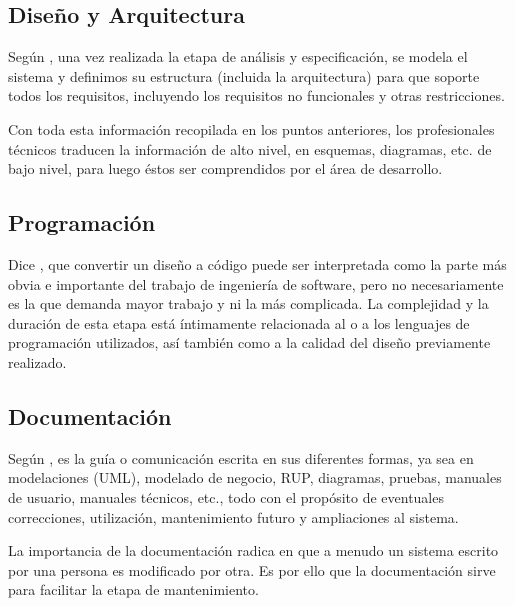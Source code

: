 \documentclass[12pt]{article}
\begin{document}
	\subsection{Diseño y Arquitectura}

	\hspace{1.27cm}Según \textcite{maida_metodologias_2015}, una vez realizada la etapa de análisis y especificación, se modela el sistema y definimos su estructura (incluida la arquitectura) para que soporte todos los requisitos, incluyendo los requisitos no funcionales y otras restricciones.

	\hspace{1.27cm}Con toda esta información recopilada en los puntos anteriores, los profesionales técnicos traducen la información de alto nivel, en esquemas, diagramas, etc. de bajo nivel, para luego éstos ser
	comprendidos por el área de desarrollo.

	\subsection{Programación}

	\hspace{1.27cm}Dice \textcite{maida_metodologias_2015}, que convertir un diseño a código puede ser interpretada como la parte más obvia e importante del trabajo de ingeniería de software, pero no necesariamente es la que demanda mayor trabajo y ni la más complicada. La complejidad y la duración de esta etapa está íntimamente relacionada al o a los lenguajes de programación utilizados, así también como a la calidad del diseño previamente realizado.

	\subsection{Documentación}

	\hspace{1.27cm}Según \textcite{maida_metodologias_2015}, es la guía o comunicación escrita en sus diferentes formas, ya sea en modelaciones (UML), modelado de negocio, RUP, diagramas, pruebas, manuales de usuario, manuales técnicos, etc., todo con el propósito de eventuales correcciones, utilización, mantenimiento futuro y ampliaciones al sistema.

	\hspace{1.27cm}La importancia de la documentación radica en que a menudo un sistema escrito por una persona es modificado por otra. Es por ello que la documentación sirve para facilitar la etapa de mantenimiento.
\end{document}
